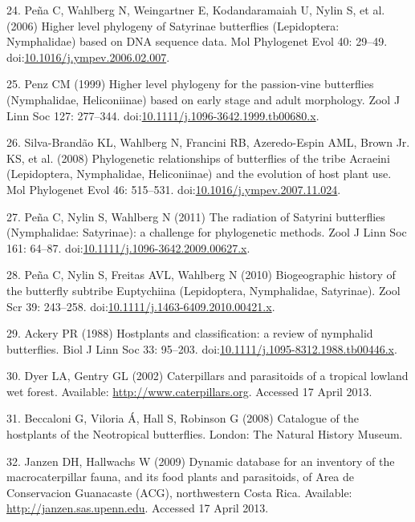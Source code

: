 \documentclass[10pt]{article}
\begin{document}
24. Peña C, Wahlberg N, Weingartner E, Kodandaramaiah U, Nylin S, et al.
(2006) Higher level phylogeny of Satyrinae butterflies (Lepidoptera:
Nymphalidae) based on DNA sequence data. Mol Phylogenet Evol 40: 29--49.
doi:\href{http://dx.doi.org/10.1016/j.ympev.2006.02.007}{10.1016/j.ympev.2006.02.007}.

25. Penz CM (1999) Higher level phylogeny for the passion-vine
butterflies (Nymphalidae, Heliconiinae) based on early stage and adult
morphology. Zool J Linn Soc 127: 277--344.
doi:\href{http://dx.doi.org/10.1111/j.1096-3642.1999.tb00680.x}{10.1111/j.1096-3642.1999.tb00680.x}.

26. Silva-Brandão KL, Wahlberg N, Francini RB, Azeredo-Espin AML, Brown
Jr. KS, et al. (2008) Phylogenetic relationships of butterflies of the
tribe Acraeini (Lepidoptera, Nymphalidae, Heliconiinae) and the
evolution of host plant use. Mol Phylogenet Evol 46: 515--531.
doi:\href{http://dx.doi.org/10.1016/j.ympev.2007.11.024}{10.1016/j.ympev.2007.11.024}.

27. Peña C, Nylin S, Wahlberg N (2011) The radiation of Satyrini
butterflies (Nymphalidae: Satyrinae): a challenge for phylogenetic
methods. Zool J Linn Soc 161: 64--87.
doi:\href{http://dx.doi.org/10.1111/j.1096-3642.2009.00627.x}{10.1111/j.1096-3642.2009.00627.x}.

28. Peña C, Nylin S, Freitas AVL, Wahlberg N (2010) Biogeographic
history of the butterfly subtribe Euptychiina (Lepidoptera, Nymphalidae,
Satyrinae). Zool Scr 39: 243--258.
doi:\href{http://dx.doi.org/10.1111/j.1463-6409.2010.00421.x}{10.1111/j.1463-6409.2010.00421.x}.

29. Ackery PR (1988) Hostplants and classification: a review of
nymphalid butterflies. Biol J Linn Soc 33: 95--203.
doi:\href{http://dx.doi.org/10.1111/j.1095-8312.1988.tb00446.x}{10.1111/j.1095-8312.1988.tb00446.x}.

30. Dyer LA, Gentry GL (2002) Caterpillars and parasitoids of a tropical
lowland wet forest. Available: \url{http://www.caterpillars.org}.
Accessed 17 April 2013.

31. Beccaloni G, Viloria Á, Hall S, Robinson G (2008) Catalogue of the
hostplants of the Neotropical butterflies. London: The Natural History
Museum.

32. Janzen DH, Hallwachs W (2009) Dynamic database for an inventory of
the macrocaterpillar fauna, and its food plants and parasitoids, of Area
de Conservacion Guanacaste (ACG), northwestern Costa Rica. Available:
\url{http://janzen.sas.upenn.edu}. Accessed 17 April 2013.
\end{document}
